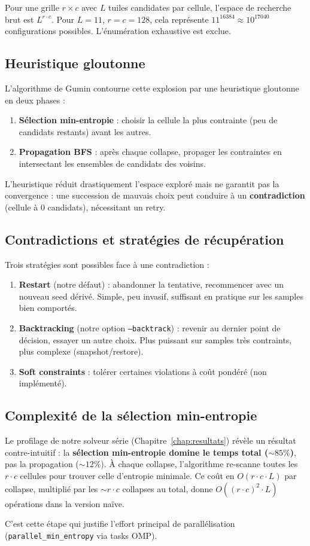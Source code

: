 Pour une grille $r \times c$ avec $L$ tuiles candidates par cellule, l'espace de recherche brut est $L^{r \cdot c}$. Pour $L = 11$, $r = c = 128$, cela représente $11^{16384} \approx 10^{17040}$ configurations possibles. L'énumération exhaustive est exclue.

\subsection{Heuristique gloutonne}

L'algorithme de Gumin contourne cette explosion par une heuristique gloutonne en deux phases :
\begin{enumerate}
    \item \textbf{Sélection min-entropie} : choisir la cellule la plus contrainte (peu de candidats restants) avant les autres.
    \item \textbf{Propagation BFS} : après chaque collapse, propager les contraintes en intersectant les ensembles de candidats des voisins.
\end{enumerate}

L'heuristique réduit drastiquement l'espace exploré mais ne garantit pas la convergence : une succession de mauvais choix peut conduire à un \textbf{contradiction} (cellule à 0 candidats), nécessitant un retry.

\subsection{Contradictions et stratégies de récupération}

Trois stratégies sont possibles face à une contradiction :
\begin{enumerate}
    \item \textbf{Restart} (notre défaut) : abandonner la tentative, recommencer avec un nouveau seed dérivé. Simple, peu invasif, suffisant en pratique sur les samples bien comportés.
    \item \textbf{Backtracking} (notre option \texttt{--backtrack}) : revenir au dernier point de décision, essayer un autre choix. Plus puissant sur samples très contraints, plus complexe (snapshot/restore).
    \item \textbf{Soft constraints} : tolérer certaines violations à coût pondéré (non implémenté).
\end{enumerate}

\subsection{Complexité de la sélection min-entropie}

Le profilage de notre solveur série (Chapitre~\ref{chap:resultats}) révèle un résultat contre-intuitif : la \textbf{sélection min-entropie domine le temps total ($\sim 85\%$)}, pas la propagation ($\sim 12\%$). À chaque collapse, l'algorithme re-scanne toutes les $r \cdot c$ cellules pour trouver celle d'entropie minimale. Ce coût en $O(r \cdot c \cdot L)$ par collapse, multiplié par les $\sim r \cdot c$ collapses au total, donne $O((r \cdot c)^2 \cdot L)$ opérations dans la version naïve.

C'est cette étape qui justifie l'effort principal de parallélisation (\texttt{parallel\_min\_entropy} via tasks OMP).
